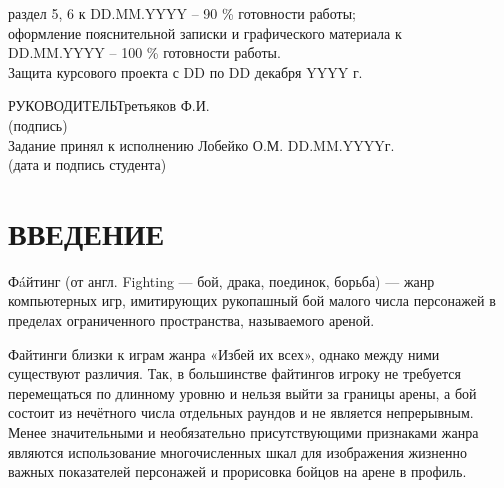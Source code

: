 \documentclass[14pt,a4paper]{extreport}
\begin{document}
\begin{enumerate}
	\underline{\hspace*{16cm}}\hspace*{-16cm}раздел 5, 6 к DD.MM.YYYY  –  90 \% готовности работы;\\
	\underline{\hspace*{16cm}}\hspace*{-16cm}оформление пояснительной записки и графического материала к\\
	\underline{\hspace*{16cm}}\hspace*{-16cm}DD.MM.YYYY – 100 \% готовности работы.\\
	\underline{\hspace*{16cm}}\hspace*{-16cm}Защита курсового проекта с DD по DD декабря YYYY г.\\
	\end{enumerate}
	\hspace*{7cm}РУКОВОДИТЕЛЬ\underline{\hspace*{6cm}}\hspace*{-3.9cm}Третьяков Ф.И.\\
	\hspace*{11.5cm}\small (подпись) \normalsize\\
	\bigskip
	Задание принял к исполнению \underline{\hspace*{10.5cm}}\hspace*{-8cm} Лобейко О.М. DD.MM.YYYYг.\\
	\hspace*{7cm}\small (дата и подпись студента) \normalsize\\
	\newpage
	\pagestyle{plain}
	
	\renewcommand\contentsname{\center\normalsize \textbf{СОДЕРЖАНИЕ} \endcenter}
	\tableofcontents
	\endcenter
	\newpage
	\section*{\center\normalsize ВВЕДЕНИЕ \endcenter}
	\hspace{4ex}Фáйтинг (от англ. Fighting — бой, драка, поединок, борьба) — жанр компьютерных игр, имитирующих рукопашный бой малого числа персонажей в пределах ограниченного пространства, называемого ареной.

Файтинги близки к играм жанра «Избей их всех», однако между ними существуют различия. Так, в большинстве файтингов игроку не требуется перемещаться по длинному уровню и нельзя выйти за границы арены, а бой состоит из нечётного числа отдельных раундов и не является непрерывным. Менее значительными и необязательно присутствующими признаками жанра являются использование многочисленных шкал для изображения жизненно важных показателей персонажей и прорисовка бойцов на арене в профиль.\\
\end{document}
